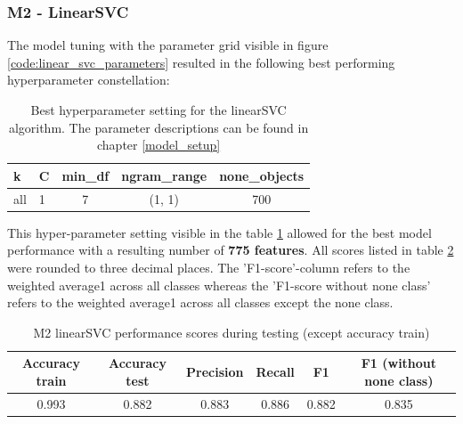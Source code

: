 \subsubsection{M2 - LinearSVC}
The model tuning with the parameter grid visible in figure \ref{code:linear_svc_parameters} resulted in the following best performing hyperparameter constellation:

\begin{table}[h!]
\begin{center}
\caption{Best hyperparameter setting for the linearSVC algorithm. The parameter descriptions can be found in chapter \ref{model_setup}}\vspace{1ex}
\label{tab:m2_linearSVC_bestParams}
\begin{tabular}{llccc}\hline
k & C & min\_df & ngram\_range & none\_objects \\ \hline
all & 1 & 7 & (1, 1) & 700 \\ \hline
\end{tabular}
\end{center}
\end{table}

This hyper-parameter setting visible in the table \ref{tab:m2_linearSVC_bestParams} allowed for the best model performance with a resulting number of \textbf{775 features}. All scores listed in table \ref{tab:m2_linearSVC_bestscores} were rounded to three decimal places. The 'F1-score'-column refers to the weighted average1 across all classes whereas the 'F1-score without none class' refers to the weighted average1 across all classes except the none class.

\begin{table}[h!]
\begin{center}
\caption{M2 linearSVC performance scores during testing (except accuracy train)}\vspace{1ex}
\label{tab:m2_linearSVC_bestscores}
\begin{tabular}{cccccc}\hline
Accuracy train & Accuracy test & Precision & Recall & F1 & F1 (without none class)\\ \hline
0.993 & 0.882 & 0.883 & 0.886 & 0.882 & 0.835 \\ \hline
\end{tabular}
\end{center}
\end{table}

